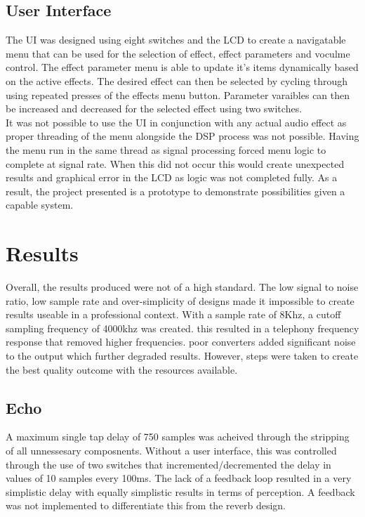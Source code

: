 \documentclass[titlepage]{scrartcl}
\begin{document}
    \subsection{User Interface}
    The UI was designed using eight switches and the LCD to create a
    navigatable menu that can be used for the selection of effect, effect
    parameters and voculme control. The effect parameter menu is able to update
    it's items dynamically based on the active effects. The desired effect can
    then be selected by cycling through using repeated presses of the effects
    menu button. Parameter varaibles can then be increased and decreased for
    the selected effect using two switches.\\
    It was not possible to use the UI in conjunction with any actual audio
    effect as proper threading of the menu alongside the DSP process was not
    possible. Having the menu run in the same thread as signal processing
    forced menu logic to complete at signal rate. When this did not occur this
    would create unexpected results and graphical error in the LCD as logic was
    not completed fully. As a result, the project presented is a prototype to
    demonstrate possibilities given a capable system.

    \section{Results}
    Overall, the results produced were not of a high standard. The low signal
    to noise ratio, low sample rate and over-simplicity of designs made it
    impossible to create results useable in a professional context. With a
    sample rate of 8Khz, a cutoff sampling frequency of 4000khz was created.
    this resulted in a telephony frequency response that removed higher
    frequencies. poor converters added significant noise to the output which
    further degraded results. However, steps were taken to create the best
    quality outcome with the resources available.
        \subsection{Echo}
        A maximum single tap delay of 750 samples was acheived through the
        stripping of all unnessesary composnents. Without a user interface,
        this was controlled through the use of two switches that
        incremented/decremented the delay in values of 10 samples every 100ms. 
        The lack of a feedback loop resulted in a very simplistic delay with
        equally simplistic results in terms of perception. A feedback was not
        implemented to differentiate this from the reverb design.
\end{document}
